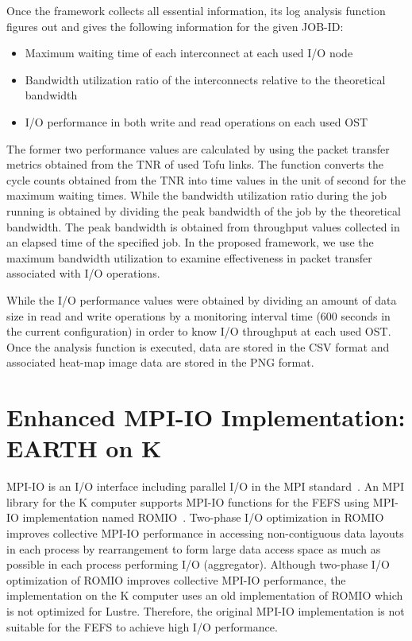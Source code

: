 \documentclass{jhps}
\begin{document}
Once the framework collects all essential information, its log analysis function
figures out and gives the following information for the given JOB-ID:
\begin{itemize}
\item Maximum waiting time of each interconnect at each used I/O node
\item Bandwidth utilization ratio of the interconnects relative to the theoretical bandwidth
\item I/O performance in both write and read operations on each used OST
\end{itemize}
%
The former two performance values are calculated by using the packet transfer metrics
obtained from the TNR of used Tofu links.
The function converts the cycle counts obtained from the TNR
into time values in the unit of second for the maximum waiting times.
While the bandwidth utilization ratio during the job running is obtained by
dividing the peak bandwidth of the job by the theoretical bandwidth.
The peak bandwidth is obtained from throughput values collected
in an elapsed time of the specified job.
In the proposed framework, we use the maximum bandwidth utilization
to examine effectiveness in packet transfer associated with I/O operations.

While the I/O performance values were obtained by dividing an amount of data size
in read and write operations by a monitoring
interval time (600 seconds in the current configuration) in order to know
I/O throughput at each used OST.
Once the analysis function is executed, data are stored in the CSV format
and associated heat-map image data are stored in the PNG format.

\section{Enhanced MPI-IO Implementation: EARTH on K}
\label{sec:EARTH}

MPI-IO is an I/O interface including parallel I/O in the MPI standard~\cite{mpi-forum:web}.
An MPI library for the K computer supports MPI-IO functions for the FEFS
using MPI-IO implementation named ROMIO~\cite{thakur:romio}.
Two-phase I/O optimization in ROMIO
improves collective MPI-IO performance in accessing
non-contiguous data layouts in each process by rearrangement
to form large data access space as much as possible in each process
performing I/O (aggregator).
Although two-phase I/O optimization of ROMIO improves collective MPI-IO performance,
the implementation on the K computer uses an old implementation of ROMIO
which is not optimized for Lustre.
Therefore, the original MPI-IO implementation is not suitable
for the FEFS to achieve high I/O performance.
\end{document}
